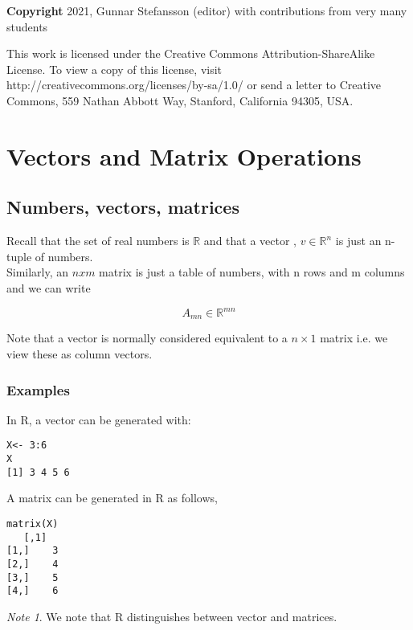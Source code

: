 \documentclass[12pt,a4paper]{article}
\theoremstyle{regla}
\theoremstyle{remark}
\newtheorem{notes}{Note}[section]
\theoremstyle{definition}
\theoremstyle{nonumberbreak}
\begin{document}
{\bf Copyright}
2021, Gunnar Stefansson (editor) with contributions from very many students

This work is licensed under the Creative Commons
Attribution-ShareAlike License. To view a copy of this license, visit
http://creativecommons.org/licenses/by-sa/1.0/ or send a letter to
Creative Commons, 559 Nathan Abbott Way, Stanford, California 94305,
USA.
\clearpage
\section{Vectors and Matrix Operations}
\subsection{Numbers, vectors, matrices}
\begin{fbox}
\begin{minipage}{0.97\textwidth}
Recall that the set of real numbers is $\mathbb{R}$ and that a vector , $v \in \mathbb{R}^n$ is just an n-tuple of numbers.\\

Similarly, an $n x m$ matrix is just a table of numbers, with n rows and m columns and we can write 

$$A_{mn} \in \mathbb{R}^{mn}$$

Note that a vector is normally considered equivalent to a  $n\times1$ matrix i.e. we view these as column vectors.

\end{minipage}
\end{fbox}
\subsubsection{Examples}
\begin{xmpl}
In R, a vector can be generated with:

\begin{lstlisting}
X<- 3:6
X
[1] 3 4 5 6
\end{lstlisting}

A matrix can be generated in R as follows,
\begin{lstlisting}
matrix(X)
   [,1]
[1,]    3
[2,]    4
[3,]    5
[4,]    6
\end{lstlisting}

\begin{notes}
We note that R distinguishes between vector and matrices.
\end{notes}
\end{xmpl}
\end{document}
